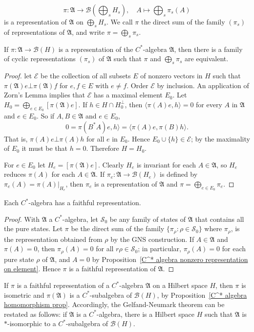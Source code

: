 \[\pi:\mathfrak{A}\to\mathcal{B}(\bigoplus_sH_s),\quad A\mapsto\bigoplus_s\pi_s(A)\]
is a representation of $\mathfrak{A}$ on $\bigoplus_sH_s$. We call $\pi$ the direct sum of the family $(\pi_s)$ of representations of $\mathfrak{A}$, and write $\pi=\bigoplus_s\pi_s$.
\begin{proposition}\label{C^* algebra representation is sum of cyclic}
If $\pi:\mathfrak{A}\to\mathcal{B}(H)$ is a representation of the $C^*$-algebra $\mathfrak{A}$, then there is a family of cyclic representations $(\pi_s)$ of $\mathfrak{A}$ such that $\pi$ and $\bigoplus_s\pi_s$ are equivalent.
\end{proposition}
\begin{proof}
let $\mathscr{E}$ be the collection of all subsets $E$ of nonzero vectors in $H$ such that $\pi(\mathfrak{A})e\bot\pi(\mathfrak{A})f$ for $e,f\in E$ with $e\neq f$. Order $\mathscr{E}$ by inclusion. An application of Zorn's Lemma implies that $\mathscr{E}$ has a maximal element $E_0$. Let $H_0=\bigoplus_{e\in E_0}[\pi(\mathfrak{A})e]$. If $h\in H\cap H_0^\bot$, then $\langle\pi(A)e,h\rangle=0$ for every $A$ in $\mathfrak{A}$ and $e\in E_0$. So if $A,B\in\mathfrak{A}$ and $e\in E_0$,
\[0=\pi(B^*A)e,h\rangle=\langle\pi(A)e,\pi(B)h\rangle.\]
That is, $\pi(A)e\bot\pi(A)h$ for all $e$ in $E_0$. Hence $E_0\cup\{h\}\in\mathscr{E}$; by the maximality of $E_0$ it must be that $h=0$.  Therefore $H=H_0$.\par
For $e\in E_0$ let $H_e=[\pi(\mathfrak{A})e]$. Clearly $H_e$ is invariant for each $A\in\mathfrak{A}$, so $H_e$ reduces $\pi(A)$ for each $A\in\mathfrak{A}$. If $\pi_e:\mathfrak{A}\to\mathcal{B}(H_e)$ is defined by $\pi_e(A)=\pi(A)|_{H_e}$, then $\pi_e$ is a representation of $\mathfrak{A}$ and $\pi=\bigoplus_{e\in E_0}\pi_e$.
\end{proof}
\begin{theorem}
Each $C^*$-algebra has a faithful representation.
\end{theorem}
\begin{proof}
With $\mathfrak{A}$ a $C^*$-algebra, let $\mathcal{S}_0$ be any family of states of $\mathfrak{A}$ that contains all the pure states. Let $\pi$ be the direct sum of the family $\{\pi_\rho:\rho\in\mathcal{S}_0\}$ where $\pi_\rho$, is the representation obtained from $\rho$ by the GNS construction. If $A\in\mathfrak{A}$ and $\pi(A)=0$, then $\pi_\rho(A)=0$ for all $r\rho\in\mathcal{S}_0$; in particular, $\pi_\rho(A)=0$ for each pure state $\rho$ of $\mathfrak{A}$, and $A=0$ by Proposition~\ref{C^* algebra nonzero representation on element}. Hence $\pi$ is a faithful representation of $\mathfrak{A}$.
\end{proof}
\begin{remark}
If $\pi$ is a faithful representation of a $C^*$-algebra $\mathfrak{A}$ on a Hilbert space $H$, then $\pi$ is isometric and $\pi(\mathfrak{A})$ is a $C^*$-subalgebra of $\mathcal{B}(H)$, by Proposition~\ref{C^* algebra homomorphism prop}. Accordingly, the Gelfand-Neumark theorem can be restated as follows: if $\mathfrak{A}$ is a $C^*$-algebra, there is a Hilbert space $H$ such that $\mathfrak{A}$ is $*$-isomorphic to a $C^*$-subalgebra of $\mathcal{B}(H)$.
\end{remark}
